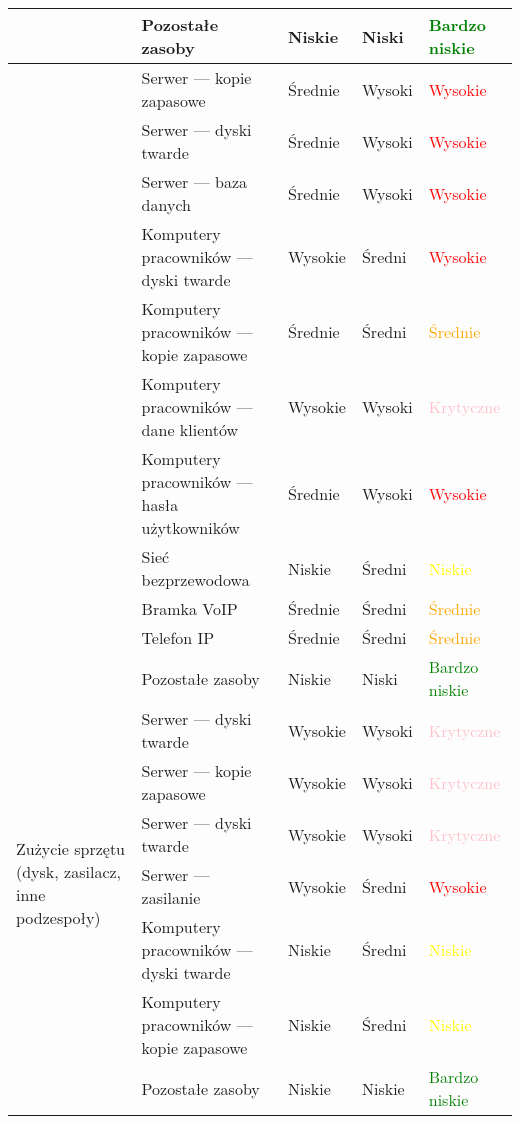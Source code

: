 \begin{landscape}
\begin{longtable}[!ht]{|m{4cm}|m{6cm}|m{4.5cm}|m{3cm}|m{3cm}|}
		& Pozostałe zasoby & Niskie & Niski & \textcolor{green}{Bardzo niskie} \\ \cline{2-5}
	\hline 
	\newpage
	\hline
	\multirow{11}{4cm}{Szkodliwe oprogramowanie} 
		& Serwer --- kopie zapasowe & Średnie & Wysoki & \textcolor{red}{Wysokie} \\ \cline{2-5}
		& Serwer --- dyski twarde & Średnie & Wysoki & \textcolor{red}{Wysokie} \\ \cline{2-5}
		& Serwer --- baza danych & Średnie & Wysoki & \textcolor{red}{Wysokie} \\ \cline{2-5}
		& Komputery pracowników --- dyski twarde & Wysokie & Średni & \textcolor{red}{Wysokie} \\ \cline{2-5}
		& Komputery pracowników --- kopie zapasowe & Średnie & Średni & \textcolor{orange}{Średnie} \\ \cline{2-5}
		& Komputery pracowników --- dane klientów & Wysokie & Wysoki & \textcolor{pink}{Krytyczne} \\ \cline{2-5}
		& Komputery pracowników --- hasła użytkowników & Średnie & Wysoki & \textcolor{red}{Wysokie} \\ \cline{2-5}
		& Sieć bezprzewodowa & Niskie & Średni & \textcolor{yellow}{Niskie} \\ \cline{2-5}
		& Bramka VoIP & Średnie & Średni & \textcolor{orange}{Średnie} \\ \cline{2-5}
		& Telefon IP & Średnie & Średni & \textcolor{orange}{Średnie} \\ \cline{2-5}
		& Pozostałe zasoby & Niskie & Niski & \textcolor{green}{Bardzo niskie} \\ \cline{2-5}
	\hline
 	\multirow{6}{4cm}{Zużycie sprzętu (dysk, zasilacz, inne podzespoły)}
 		& Serwer --- dyski twarde & Wysokie & Wysoki & \textcolor{pink}{Krytyczne} \\ \cline{2-5}
 		& Serwer --- kopie zapasowe & Wysokie & Wysoki & \textcolor{pink}{Krytyczne} \\ \cline{2-5}
 		& Serwer --- dyski twarde & Wysokie & Wysoki & \textcolor{pink}{Krytyczne} \\ \cline{2-5}
 		& Serwer --- zasilanie & Wysokie &Średni & \textcolor{red}{Wysokie} \\ \cline{2-5}
 		& Komputery pracowników --- dyski twarde & Niskie & Średni & \textcolor{yellow}{Niskie} \\ \cline{2-5}
 		& Komputery pracowników --- kopie zapasowe & Niskie & Średni & \textcolor{yellow}{Niskie} \\ \cline{2-5}
 		& Pozostałe zasoby & Niskie & Niskie & \textcolor{green}{Bardzo niskie} \\

\end{longtable}
\end{landscape}
